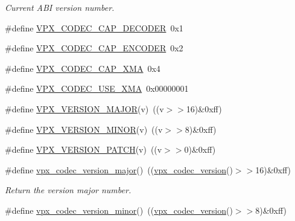 \begin{DoxyCompactItemize}
\begin{DoxyCompactList}\small\item\em Current A\-B\-I version number. \end{DoxyCompactList}\item 
\#define \hyperlink{group__codec_gae10ad7f9548170aef77df09d48ad108a}{V\-P\-X\-\_\-\-C\-O\-D\-E\-C\-\_\-\-C\-A\-P\-\_\-\-D\-E\-C\-O\-D\-E\-R}~0x1
\item 
\#define \hyperlink{group__codec_gab2e8b76fff95ebd573a17bdc11f8a441}{V\-P\-X\-\_\-\-C\-O\-D\-E\-C\-\_\-\-C\-A\-P\-\_\-\-E\-N\-C\-O\-D\-E\-R}~0x2
\item 
\#define \hyperlink{group__codec_gadbaf864317eb8294fd518862a1e6f9d4}{V\-P\-X\-\_\-\-C\-O\-D\-E\-C\-\_\-\-C\-A\-P\-\_\-\-X\-M\-A}~0x4
\item 
\#define \hyperlink{group__codec_gab363c255f13717f693762c3dcf0b93d6}{V\-P\-X\-\_\-\-C\-O\-D\-E\-C\-\_\-\-U\-S\-E\-\_\-\-X\-M\-A}~0x00000001
\item 
\#define \hyperlink{group__codec_gadebddd67347fe47c0772b1e06b6173ba}{V\-P\-X\-\_\-\-V\-E\-R\-S\-I\-O\-N\-\_\-\-M\-A\-J\-O\-R}(v)~((v$>$$>$16)\&0xff)
\item 
\#define \hyperlink{group__codec_ga4a5ce4588576306dee0d95e8f8706f86}{V\-P\-X\-\_\-\-V\-E\-R\-S\-I\-O\-N\-\_\-\-M\-I\-N\-O\-R}(v)~((v$>$$>$8)\&0xff)
\item 
\#define \hyperlink{group__codec_ga4acf2cf4c35ff123d17cd67c069fdbaa}{V\-P\-X\-\_\-\-V\-E\-R\-S\-I\-O\-N\-\_\-\-P\-A\-T\-C\-H}(v)~((v$>$$>$0)\&0xff)
\item 
\hypertarget{group__codec_gaf314b746e4e202045e85ac073c29a495}{\#define \hyperlink{group__codec_gaf314b746e4e202045e85ac073c29a495}{vpx\-\_\-codec\-\_\-version\-\_\-major}()~((\hyperlink{group__codec_ga163037ae037ac760da65e4130c7d4767}{vpx\-\_\-codec\-\_\-version}()$>$$>$16)\&0xff)}\label{group__codec_gaf314b746e4e202045e85ac073c29a495}

\begin{DoxyCompactList}\small\item\em Return the version major number. \end{DoxyCompactList}\item 
\hypertarget{group__codec_ga2b668688a7d1551ea89bcda8f2587f93}{\#define \hyperlink{group__codec_ga2b668688a7d1551ea89bcda8f2587f93}{vpx\-\_\-codec\-\_\-version\-\_\-minor}()~((\hyperlink{group__codec_ga163037ae037ac760da65e4130c7d4767}{vpx\-\_\-codec\-\_\-version}()$>$$>$8)\&0xff)}\label{group__codec_ga2b668688a7d1551ea89bcda8f2587f93}


\end{DoxyCompactItemize}
